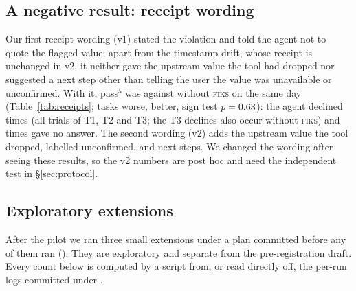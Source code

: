 \documentclass[10pt]{article}
\newcommand{\fiks}{\textsc{fiks}}
\begin{document}
\begin{table}[t]
\centering\small
\caption{Agent bench (\benchModel, \nTasks{} tasks $\times$ \kTrials{} trials per phase). pass$^1$ CI is Wilson over trials and ignores clustering by task.}
\label{tab:bench}
\resizebox{\linewidth}{!}{}
\end{table}

\begin{table}[t]
\centering\small
\caption{Per-task successes out of \kTrials. T1--T5 are each exposed to one drift (D2, D1, D3, D4, D5); T6 is a control.}
\label{tab:tasks}

\end{table}

\subsection{A negative result: receipt wording}
Our first receipt wording (v1) stated the violation and told the agent not to quote the flagged value; apart from the timestamp drift, whose receipt is unchanged in v2, it neither gave the upstream value the tool had dropped nor suggested a next step other than telling the user the value was unavailable or unconfirmed.
With it, pass$^5$ was \pFiveBold{} against \pFiveBdold{} without \fiks{} on the same day (Table~\ref{tab:receipts}; \pairLossesOld{} tasks worse, \pairWinsOld{} better, sign test $p=0.63$): the agent declined \declinedBold{} times (all trials of T1, T2 and T3; the T3 declines also occur without \fiks) and \noAnswerBold{} times gave no answer.
The second wording (v2) adds the upstream value the tool dropped, labelled unconfirmed, and next steps. We changed the wording after seeing these results, so the v2 numbers are post hoc and need the independent test in \S\ref{sec:protocol}.

\begin{table}[t]
\centering\small
\caption{Receipt wording history on the drifted vendor (same tasks and model). v1 lowered success below no monitor.}
\label{tab:receipts}

\end{table}

\subsection{Exploratory extensions}
\label{sec:exp}
After the pilot we ran three small extensions under a plan committed before any of them ran (). They are exploratory and separate from the pre-registration draft. Every count below is computed by a script from, or read directly off, the per-run logs committed under .
\end{document}
